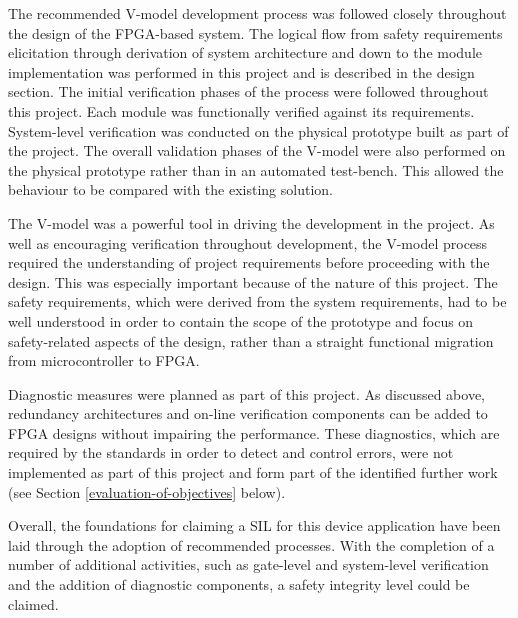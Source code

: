The recommended V-model development process was followed closely throughout the design of the FPGA-based system. The logical flow from safety requirements elicitation through derivation of system architecture and down to the module implementation was performed in this project and is described in the design section. The initial verification phases of the process were followed throughout this project. Each module was functionally verified against its requirements. System-level verification was conducted on the physical prototype built as part of the project. The overall validation phases of the V-model were also performed on the physical prototype rather than in an automated test-bench. This allowed the behaviour to be compared with the existing solution.

The V-model was a powerful tool in driving the development in the project. As well as encouraging verification throughout development, the V-model process required the understanding of project requirements before proceeding with the design. This was especially important because of the nature of this project. The safety requirements, which were derived from the system requirements, had to be well understood in order to contain the scope of the prototype and focus on safety-related aspects of the design, rather than a straight functional migration from microcontroller to FPGA.



Diagnostic measures were planned as part of this project. As discussed above, redundancy architectures and on-line verification components can be added to FPGA designs without impairing the performance\cite{Dubey}. These diagnostics, which are required by the standards in order to detect and control errors, were not implemented as part of this project and form part of the identified further work (see Section \ref{evaluation-of-objectives} below).


Overall, the foundations for claiming a SIL for this device application have been laid through the adoption of recommended processes. With the completion of a number of additional activities, such as gate-level and system-level verification and the addition of diagnostic components, a safety integrity level could be claimed\cite{IEC61508}.


